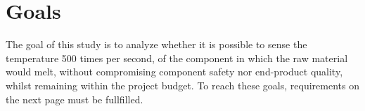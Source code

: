 \chapter*{Goals}
The goal of this study is to analyze whether it is possible to sense the
temperature 500 times per second, of the component in which the raw material
would melt, without compromising component safety nor end-product quality,
whilst remaining within the project budget. To reach these goals,
requirements on the next page must be fullfilled.